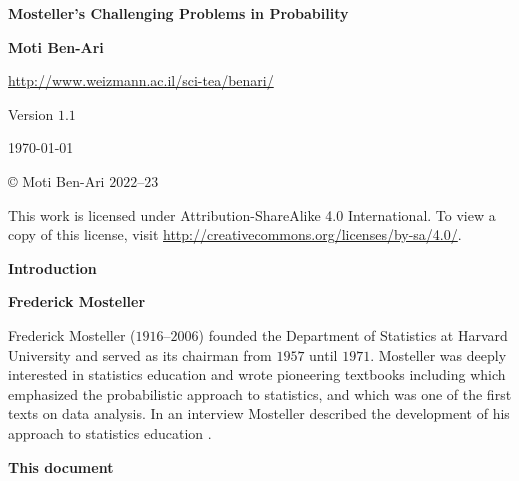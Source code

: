 

\thispagestyle{empty}

\begin{center}
\textbf{\LARGE Mosteller's Challenging Problems in Probability}

\bigskip
\bigskip
\bigskip

\textbf{\Large Moti Ben-Ari}

\bigskip

\url{http://www.weizmann.ac.il/sci-tea/benari/}

\bigskip
\bigskip
\bigskip

Version $1.1$

\bigskip

\today

\end{center}

\vfill

\begin{center}
\copyright{} Moti Ben-Ari $2022$--$23$
 \end{center}
 
\begin{small}
This work is licensed under Attribution-ShareAlike 4.0 International. To view a copy of this license, visit \url{http://creativecommons.org/licenses/by-sa/4.0/}.
\end{small}
\newpage

\tableofcontents

\newpage


\begin{center}
\textbf{\LARGE Introduction}
\end{center}


\bigskip

\textbf{Frederick Mosteller}

Frederick Mosteller ($1916$--$2006$) founded the Department of Statistics at Harvard University and served as its chairman from $1957$ until $1971$. Mosteller was deeply interested in statistics education and wrote pioneering textbooks including \cite{pwsa} which emphasized the probabilistic approach to statistics, and \cite{bsda} which was one of the first texts on data analysis. In an interview Mosteller described the development of his approach to statistics education \cite{gse}.

\textbf{This document}

